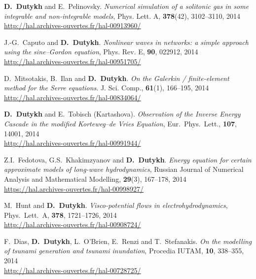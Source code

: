 \begin{etaremune}
  \item \textbf{D.~Dutykh} and E.~Pelinovsky. \textit{Numerical simulation of a solitonic gas in some integrable and non-integrable models}, Phys. Lett. A, \textbf{378}(42), 3102--3110, 2014 \\ %
  \url{http://hal.archives-ouvertes.fr/hal-00913960/}
  
  \item J.-G.~Caputo and \textbf{D.~Dutykh}. \textit{Nonlinear waves in networks: a simple approach using the sine--Gordon equation}, Phys. Rev. E, \textbf{90}, 022912, 2014 \\ %
  \url{http://hal.archives-ouvertes.fr/hal-00951705/}
  
  \item D.~Mitsotakis, B.~Ilan and \textbf{D.~Dutykh}. \textit{On the Galerkin / finite-element method for the Serre equations}. J. Sci. Comp., \textbf{61}(1), 166--195, 2014 \\ %
  \url{http://hal.archives-ouvertes.fr/hal-00834064/}
  
  \item \textbf{D.~Dutykh} and E.~Tobisch (Kartashova). \textit{Observation of the Inverse Energy Cascade in the modified Korteweg--de Vries Equation}, Eur.~Phys.~Lett., \textbf{107}, 14001, 2014 \\ %
  \url{http://hal.archives-ouvertes.fr/hal-00991944/}
  
  \item Z.I.~Fedotova, G.S.~Khakimzyanov and \textbf{D.~Dutykh}. \textit{Energy equation for certain approximate models of long-wave hydrodynamics}, Russian Journal of Numerical Analysis and Mathematical Modelling, \textbf{29}(3), 167--178, 2014 \\ %
  \url{https://hal.archives-ouvertes.fr/hal-00998927/}
  
  \item M.~Hunt and \textbf{D.~Dutykh}. \textit{Visco-potential flows in electrohydrodynamics}, Phys.~Lett.~A, \textbf{378}, 1721--1726, 2014 \\ %
  \url{http://hal.archives-ouvertes.fr/hal-00908724/}
  
  \item F.~Dias, \textbf{D.~Dutykh}, L.~O'Brien, E.~Renzi and T.~Stefanakis. \textit{On the modelling of tsunami generation and tsunami inundation}, Procedia IUTAM, \textbf{10}, 338--355, 2014 \\ %
  \url{http://hal.archives-ouvertes.fr/hal-00728725/}
  

\end{etaremune}
